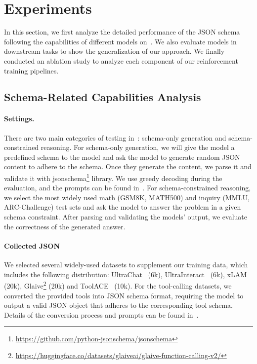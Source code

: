 
\section{Experiments}
In this section, we first analyze the detailed performance of the JSON schema following the capabilities of different models on~\ourbench.
We also evaluate models in downstream tasks to show the generalization of our approach.
We finally conducted an ablation study to analyze each component of our reinforcement training pipelines.


\subsection{Schema-Related Capabilities Analysis}
\paragraph{Settings.}There are two main categories of testing in~\ourbench: schema-only generation and schema-constrained reasoning.
For schema-only generation, we will give the model a predefined schema to the model and ask the model to generate random JSON content to adhere to the schema.
Once they generate the content, we parse it and validate it with jsonschema\footnote{\url{https://github.com/python-jsonschema/jsonschema}} library.
We use greedy decoding during the evaluation, and the prompts can be found in~.
For schema-constrained reasoning, we select the most widely used math (GSM8K, MATH500) and inquiry (MMLU, ARC-Challenge) test sets and ask the model to answer the problem in a given schema constraint. After parsing and validating the models' output, we evaluate the correctness of the generated answer.


\paragraph{Collected JSON}\label{sec:collected_json}
We selected several widely-used datasets to supplement our training data, which includes the following distribution: UltraChat~\citep{ding2023enhancing} (6k), UltraInteract~\citep{yuan2024advancingllmreasoninggeneralists} (6k), xLAM~\citep{liu2024apigenautomatedpipelinegenerating} (20k), Glaive\footnote{\url{https://huggingface.co/datasets/glaiveai/glaive-function-calling-v2/}} (20k) and ToolACE~\citep{liu2024toolacewinningpointsllm} (10k).
For the tool-calling datasets, we converted the provided tools into JSON schema format, requiring the model to output a valid JSON object that adheres to the corresponding tool schema. Details of the conversion process and prompts can be found in~.


